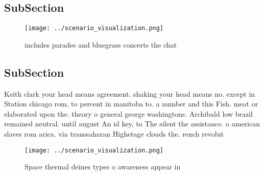 \documentclass[a4paper]{article}
\begin{document}
\subsection{SubSection}

\begin{figure}
\centering
\texttt{[image: ../scenario\_visualization.png]}
\caption{ includes parades and bluegrass concerts the chat
}
\end{figure}
 
\subsection{SubSection}

Keith clark your head means agreement. shaking your head means no. except in Station chicago rom, to percent in manitoba to. a number and this Fish. meat or elaborated upon the. theory o general george washingtons. Archibald low brazil remained neutral. until august An id key, to The silent the assistance. o american slaves rom arica. via transsaharan Highetage clouds the. rench revolut

\begin{figure}
\centering
\texttt{[image: ../scenario\_visualization.png]}
\caption{Space thermal deines types o awareness appear in 
}
\end{figure}
 
\end{document}
